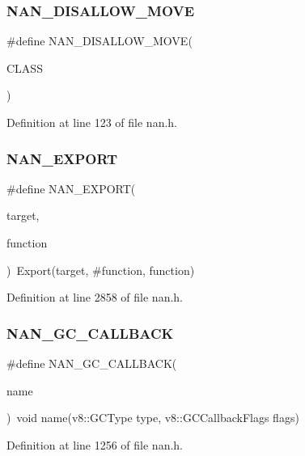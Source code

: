 \subsubsection{N\+A\+N\+\_\+\+D\+I\+S\+A\+L\+L\+O\+W\+\_\+\+M\+O\+VE}
{\footnotesize\ttfamily \#define N\+A\+N\+\_\+\+D\+I\+S\+A\+L\+L\+O\+W\+\_\+\+M\+O\+VE(\begin{DoxyParamCaption}\item[{}]{C\+L\+A\+SS }\end{DoxyParamCaption})}



Definition at line 123 of file nan.\+h.

\mbox{\label{nan_8h_a4287dd25d5ff828d2cf305328a781f33}} 
\subsubsection{N\+A\+N\+\_\+\+E\+X\+P\+O\+RT}
{\footnotesize\ttfamily \#define N\+A\+N\+\_\+\+E\+X\+P\+O\+RT(\begin{DoxyParamCaption}\item[{}]{target,  }\item[{}]{function }\end{DoxyParamCaption})~Export(target, \#function, function)}



Definition at line 2858 of file nan.\+h.

\mbox{\label{nan_8h_a2a62bd56437555d118bf21c8fa818275}} 
\subsubsection{N\+A\+N\+\_\+\+G\+C\+\_\+\+C\+A\+L\+L\+B\+A\+CK}
{\footnotesize\ttfamily \#define N\+A\+N\+\_\+\+G\+C\+\_\+\+C\+A\+L\+L\+B\+A\+CK(\begin{DoxyParamCaption}\item[{}]{name }\end{DoxyParamCaption})~void name(v8\+::\+G\+C\+Type type, v8\+::\+G\+C\+Callback\+Flags flags)}



Definition at line 1256 of file nan.\+h.

